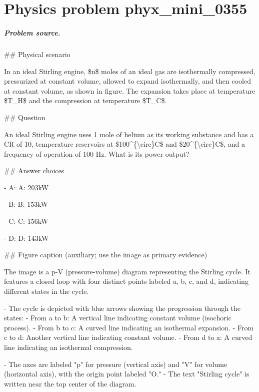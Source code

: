 
\chapter{Physics problem phyx\_mini\_0355}
\label{ch:PhyXMiniProblems_problem_phyx_mini_0355}

\paragraph{Problem source.}
\#\# Physical scenario

In an ideal Stirling engine, \$n\$ moles of an ideal gas are isothermally compressed, pressurized at constant volume, allowed to expand isothermally, and then cooled at constant volume, as shown in figure. The expansion takes place at temperature \$T\_H\$ and the compression at temperature \$T\_C\$.

\#\# Question

An ideal Stirling engine uses 1 mole of helium as its working substance and has a CR of 10, temperature reservoirs at \$100\textasciicircum{}\{\textbackslash{}circ\}C\$ and \$20\textasciicircum{}\{\textbackslash{}circ\}C\$, and a frequency of operation of 100 Hz. What is its power output?

\#\# Answer choices

- A: A: 203kW

- B: B: 153kW

- C: C: 156kW

- D: D: 143kW

\#\# Figure caption (auxiliary; use the image as primary evidence)

The image is a p-V (pressure-volume) diagram representing the Stirling cycle. It features a closed loop with four distinct points labeled a, b, c, and d, indicating different states in the cycle. 

- The cycle is depicted with blue arrows showing the progression through the states:
  - From a to b: A vertical line indicating constant volume (isochoric process).
  - From b to c: A curved line indicating an isothermal expansion.
  - From c to d: Another vertical line indicating constant volume.
  - From d to a: A curved line indicating an isothermal compression.

- The axes are labeled "p" for pressure (vertical axis) and "V" for volume (horizontal axis), with the origin point labeled "O."
- The text "Stirling cycle" is written near the top center of the diagram.


